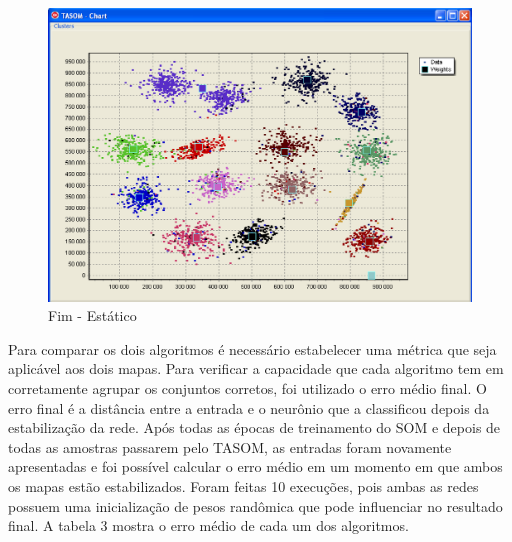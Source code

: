 \begin{figure}[!h]
\centering
\includegraphics[keepaspectratio=true,scale=0.5]
{figuras/tasom3.eps}
\caption{Fim - Estático}
\label{data_titatic}
\end{figure}  

Para comparar os dois algoritmos é necessário estabelecer uma métrica que seja aplicável aos dois mapas. Para verificar a capacidade que cada algoritmo tem em corretamente agrupar os conjuntos corretos, foi utilizado o erro médio final. O erro final é a distância entre a entrada e o neurônio que a classificou depois da estabilização da rede. Após todas as épocas de treinamento do SOM e depois de todas as amostras passarem pelo TASOM, as entradas foram novamente apresentadas e foi possível calcular o erro médio em um momento em que ambos os mapas estão estabilizados. Foram feitas 10 execuções, pois ambas as redes possuem uma inicialização de pesos randômica que pode influenciar no resultado final. A tabela 3 mostra o erro médio de cada um dos algoritmos.

